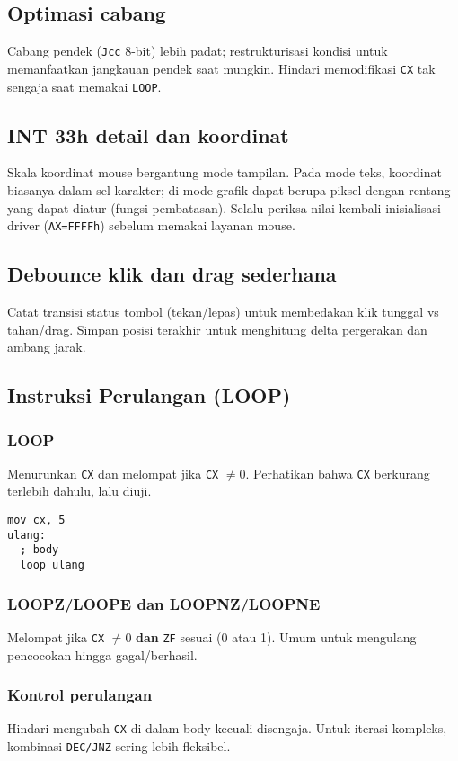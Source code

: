 \subsection{Optimasi cabang}
Cabang pendek (\texttt{Jcc} 8-bit) lebih padat; restrukturisasi kondisi untuk memanfaatkan jangkauan pendek saat mungkin. Hindari memodifikasi \texttt{CX} tak sengaja saat memakai \texttt{LOOP}. \cite{hyde2010art}

\subsection{INT 33h detail dan koordinat}
Skala koordinat mouse bergantung mode tampilan. Pada mode teks, koordinat biasanya dalam sel karakter; di mode grafik dapat berupa piksel dengan rentang yang dapat diatur (fungsi pembatasan). Selalu periksa nilai kembali inisialisasi driver (\texttt{AX=FFFFh}) sebelum memakai layanan mouse. \cite{rbil}

\subsection{Debounce klik dan drag sederhana}
Catat transisi status tombol (tekan/lepas) untuk membedakan klik tunggal vs tahan/drag. Simpan posisi terakhir untuk menghitung delta pergerakan dan ambang jarak. \cite{osdev_wiki}


\subsection{Instruksi Perulangan (LOOP)}
\subsubsection{LOOP}
Menurunkan \texttt{CX} dan melompat jika \texttt{CX} \(\neq 0\). Perhatikan bahwa \texttt{CX} berkurang terlebih dahulu, lalu diuji.
\begin{verbatim}
mov cx, 5
ulang:
  ; body
  loop ulang
\end{verbatim}

\subsubsection{LOOPZ/LOOPE dan LOOPNZ/LOOPNE}
Melompat jika \texttt{CX} \(\neq 0\) \textbf{dan} \texttt{ZF} sesuai (0 atau 1). Umum untuk mengulang pencocokan hingga gagal/berhasil.

\subsubsection{Kontrol perulangan}
Hindari mengubah \texttt{CX} di dalam body kecuali disengaja. Untuk iterasi kompleks, kombinasi \texttt{DEC/JNZ} sering lebih fleksibel.


